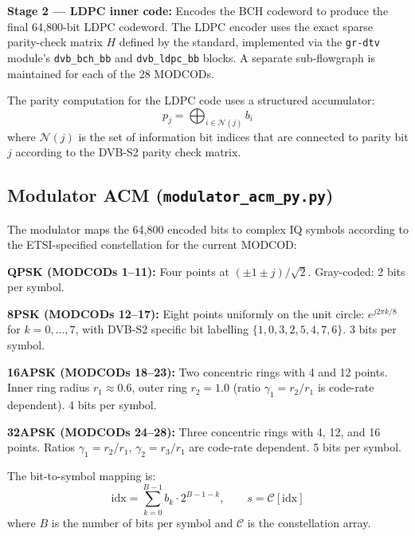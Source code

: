 \documentclass[12pt,a4paper]{report}
\begin{document}
\textbf{Stage 2 --- LDPC inner code:} Encodes the BCH codeword to produce the
final 64,800-bit LDPC codeword. The LDPC encoder uses the exact sparse
parity-check matrix $H$ defined by the standard, implemented via the
\texttt{gr-dtv} module's \texttt{dvb\_bch\_bb} and \texttt{dvb\_ldpc\_bb}
blocks. A separate sub-flowgraph is maintained for each of the 28 MODCODs.

The parity computation for the LDPC code uses a structured accumulator:
\begin{equation}
    p_j = \bigoplus_{i \in \mathcal{N}(j)} b_i
\end{equation}
where $\mathcal{N}(j)$ is the set of information bit indices that are connected
to parity bit $j$ according to the DVB-S2 parity check matrix.

\subsection{Modulator ACM (\texttt{modulator\_acm\_py.py})}

The modulator maps the 64,800 encoded bits to complex IQ symbols according to
the ETSI-specified constellation for the current MODCOD:

\textbf{QPSK (MODCODs 1--11):} Four points at $(\pm 1 \pm j)/\sqrt{2}$.
Gray-coded: 2 bits per symbol.

\textbf{8PSK (MODCODs 12--17):} Eight points uniformly on the unit circle:
$e^{j2\pi k/8}$ for $k=0,\ldots,7$, with DVB-S2 specific bit labelling
$\{1,0,3,2,5,4,7,6\}$. 3 bits per symbol.

\textbf{16APSK (MODCODs 18--23):} Two concentric rings with 4 and 12 points.
Inner ring radius $r_1 \approx 0.6$, outer ring $r_2 = 1.0$ (ratio
$\gamma_1 = r_2/r_1$ is code-rate dependent). 4 bits per symbol.

\textbf{32APSK (MODCODs 24--28):} Three concentric rings with 4, 12, and 16
points. Ratios $\gamma_1 = r_2/r_1$, $\gamma_2 = r_3/r_1$ are code-rate
dependent. 5 bits per symbol.

The bit-to-symbol mapping is:
\begin{equation}
    \text{idx} = \sum_{k=0}^{B-1} b_k \cdot 2^{B-1-k},
    \qquad s = \mathcal{C}[\text{idx}]
\end{equation}
where $B$ is the number of bits per symbol and $\mathcal{C}$ is the
constellation array.
\end{document}
